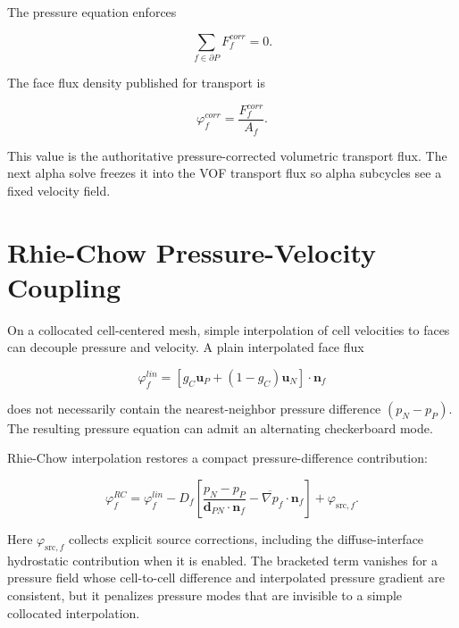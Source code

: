 \documentclass[11pt]{article}
\newcommand{\grad}{\nabla}
\begin{document}
The pressure equation enforces

\begin{equation}
  \sum_{f\in\partial P} F_f^{corr}=0.
  \label{eq:pressure-continuity}
\end{equation}

The face flux density published for transport is

\begin{equation}
  \varphi_f^{corr}=\frac{F_f^{corr}}{A_f}.
\end{equation}

This value is the authoritative pressure-corrected volumetric transport flux.
The next alpha solve freezes it into the VOF transport flux so alpha subcycles
see a fixed velocity field.

\section{Rhie-Chow Pressure-Velocity Coupling}

On a collocated cell-centered mesh, simple interpolation of cell velocities to
faces can decouple pressure and velocity.  A plain interpolated face flux

\begin{equation}
  \varphi_f^{lin}
  =
  \left[
    g_C\mathbf{u}_P+(1-g_C)\mathbf{u}_N
  \right]\cdot\mathbf{n}_f
\end{equation}

does not necessarily contain the nearest-neighbor pressure difference
\((p_N-p_P)\).  The resulting pressure equation can admit an alternating
checkerboard mode.

Rhie-Chow interpolation restores a compact pressure-difference contribution:

\begin{equation}
  \varphi_f^{RC}
  =
  \varphi_f^{lin}
  -
  D_f
  \left[
    \frac{p_N-p_P}{\mathbf{d}_{PN}\cdot\mathbf{n}_f}
    -
    \overline{\grad p}_f\cdot\mathbf{n}_f
  \right]
  +
  \varphi_{\mathrm{src},f}.
  \label{eq:rhie-chow}
\end{equation}

Here \(\varphi_{\mathrm{src},f}\) collects explicit source corrections, including
the diffuse-interface hydrostatic contribution when it is enabled.  The bracketed
term vanishes for a pressure field whose cell-to-cell difference and
interpolated pressure gradient are consistent, but it penalizes pressure modes
that are invisible to a simple collocated interpolation.
\end{document}
